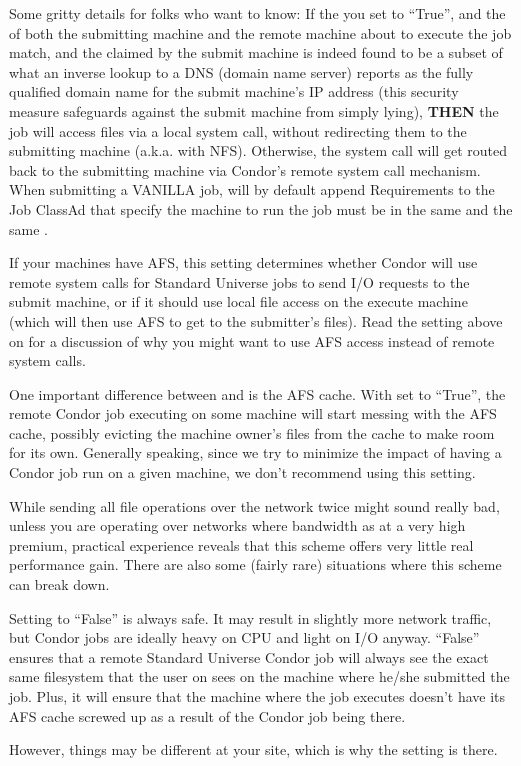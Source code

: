 \begin{description}
  Some gritty details for folks who want to know: If the you set
   to ``True'', and the  of
  both the submitting machine and the remote machine about to execute
  the job match, and the  claimed by the
  submit machine is indeed found to be a subset of what an inverse
  lookup to a DNS (domain name server) reports as the fully qualified
  domain name for the submit machine's IP address (this security
  measure safeguards against the submit machine from simply lying),
  \textbf{THEN} the job will access files via a local system call,
  without redirecting them to the submitting machine (a.k.a. with
  NFS).  Otherwise, the system call will get routed back to the
  submitting machine via Condor's remote system call mechanism.  \Note
  When submitting a VANILLA job,  will by default append
  Requirements to the Job ClassAd that specify the machine to run
  the job must be in the same  and the same
  .
  
\item[\Macro{USE\_AFS}] \label{param:UseAfs} If your machines have AFS,
  this
  setting determines whether Condor will use remote system calls for
  Standard Universe jobs to send I/O requests to the submit machine,
  or if it should use local file access on the execute machine (which
  will then use AFS to get to the submitter's files).  Read the
  setting above on  for a discussion of why you might
  want to use AFS access instead of remote system calls.
  
  One important difference between  and
   is the AFS cache.  With  set to
  ``True'', the remote Condor job executing on some machine will start
  messing with the AFS cache, possibly evicting the machine owner's
  files from the cache to make room for its own.  Generally speaking,
  since we try to minimize the impact of having a Condor job run on a
  given machine, we don't recommend using this setting.

  While sending all file operations over the network twice might sound
  really bad, unless you are operating over networks where bandwidth
  as at a very high premium, practical experience reveals that this
  scheme offers very little real performance gain.  There are also
  some (fairly rare) situations where this scheme can break down.
  
  Setting  to ``False'' is always safe.  It may result
  in slightly more network traffic, but Condor jobs are ideally heavy
  on CPU and light on I/O anyway.  ``False'' ensures that a remote
  Standard Universe Condor job will always see the exact same
  filesystem that the user on sees on the machine where he/she
  submitted the job.  Plus, it will ensure that the machine where the
  job executes doesn't have its AFS cache screwed up as a result of
  the Condor job being there.  
  
  However, things may be different at your site, which is why the
  setting is there.

\end{description}

